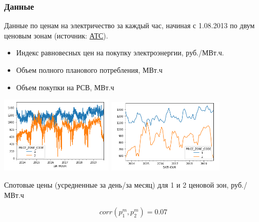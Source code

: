 \documentclass[c, dvipsnames]{beamer}  %
\begin{document}
\begin{frame}[shrink=5]
\frametitle{Данные} 


Данные по ценам на электричество за каждый час, начиная с 1.08.2013 по двум ценовым зонам (источник: \href{https://www.atsenergo.ru/results/rsv}{АТС}).

\begin{itemize}
	\item Индекс равновесных цен на покупку электроэнергии, руб./МВт.ч.
	\item Объем полного планового потребления, МВт.ч
	\item  Объем покупки на РСВ, МВт.ч	
\end{itemize}


\vfil
\hfil\hfil\includegraphics[width=5.4cm]{screenshot009}\hfil\hfil
\includegraphics[width=5.6cm]{screenshot010}
\

Спотовые цены (усредненные за день/за месяц) для 1 и 2 ценовой зон, руб./МВт.ч

\begin{equation}\label{key}
corr(p_1^m,p_2^m)  =  0.07
\end{equation}


\end{frame}

\end{document}
